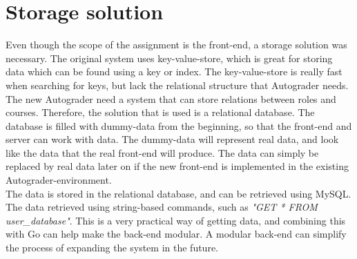 \section{Storage solution}
Even though the scope of the assignment is the front-end, a storage solution was necessary. The original system uses key-value-store, which is great for storing data which can be found using a key or index. The key-value-store is really fast when searching for keys, but lack the relational structure that Autograder needs. The new Autograder need a system that can store relations between roles and courses. Therefore, the solution that is used is a relational database. The database is filled with dummy-data from the beginning, so that the front-end and server can work with data. The dummy-data will represent real data, and look like the data that the real front-end will produce. The data can simply be replaced by real data later on if the new front-end is implemented in the existing Autograder-environment.
\\The data is stored in the relational database, and can be retrieved using MySQL. The data retrieved using string-based commands, such as \emph{"GET * FROM user\_database"}. This is a very practical way of getting data, and combining this with Go can help make the back-end modular. A modular back-end can simplify the process of expanding the system in the future.